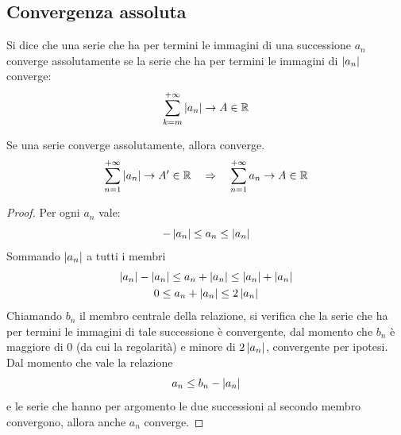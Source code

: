 \subsection{Convergenza assoluta}
\begin{defin}
	Si dice che una serie che ha per termini le immagini di una successione $a_n$ converge assolutamente se la serie che ha per termini le immagini di $\left\lvert a_n \right\rvert$ converge:
	\[
		\sum_{k=m}^{+\infty} \left\lvert a_n \right\rvert\to A\in\mathbb{R}
	\]
\end{defin}
\begin{teor}
	\label{teor:convass}
	Se una serie converge assolutamente, allora converge.
	\[
		\sum_{n=1}^{+\infty}\left\lvert a_n \right\rvert\to A'\in\mathbb{R}\quad\Rightarrow\quad \sum_{n=1}^{+\infty} a_n\to A\in\mathbb{R}
	\]
\end{teor}
\begin{proof}
	Per ogni $a_n$ vale:
	\[
		-\left\lvert a_n \right\rvert\leq a_n\leq \left\lvert a_n \right\rvert
	\]
	Sommando $\left\lvert a_n \right\rvert$ a tutti i membri
	\begin{gather*}
		\left\lvert a_n \right\rvert-\left\lvert a_n \right\rvert\leq a_n+\left\lvert a_n \right\rvert\leq \left\lvert a_n \right\rvert+\left\lvert a_n \right\rvert\\
		0\leq a_n+\left\lvert a_n \right\rvert\leq 2\left\lvert a_n \right\rvert
	\end{gather*}
	Chiamando $b_n$ il membro centrale della relazione, si verifica che la serie che ha per termini le immagini di tale successione è convergente, dal momento che $b_n$ è maggiore di $0$ (da cui la regolarità) e minore di $2\left\lvert a_n \right\rvert$, convergente per ipotesi. Dal momento che vale la relazione
	\[
		a_n\leq b_n-\left\lvert a_n \right\rvert
	\]
	e le serie che hanno per argomento le due successioni al secondo membro convergono, allora anche $a_n$ converge.
\end{proof}


